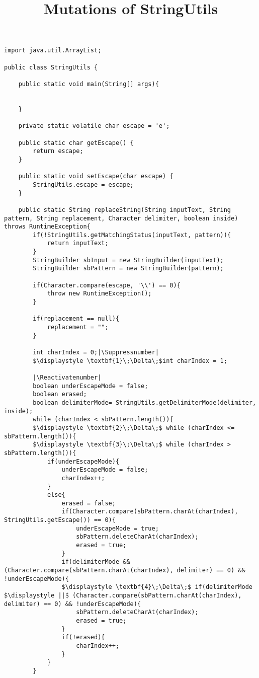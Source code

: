 \documentclass{article}
\makeatletter
\let\origthelstnumber\thelstnumber
\newcommand*\Suppressnumber{%
  \lst@AddToHook{OnNewLine}{%
    \let\thelstnumber\relax%
     \advance\c@lstnumber-\@ne\relax%
    }%
}
\newcommand*\Reactivatenumber{%
  \lst@AddToHook{OnNewLine}{%
   \let\thelstnumber\origthelstnumber%
   \advance\c@lstnumber\@ne\relax}%
}
\makeatother
\begin{document}
\title{Mutations of StringUtils}
\date{}
\maketitle

\begin{lstlisting}
import java.util.ArrayList;

public class StringUtils {

    public static void main(String[] args){
	

    }

    private static volatile char escape = 'e';

    public static char getEscape() {
        return escape;
    }

    public static void setEscape(char escape) {
        StringUtils.escape = escape;
    }

    public static String replaceString(String inputText, String pattern, String replacement, Character delimiter, boolean inside) throws RuntimeException{
        if(!StringUtils.getMatchingStatus(inputText, pattern)){
            return inputText;
        }
        StringBuilder sbInput = new StringBuilder(inputText);
        StringBuilder sbPattern = new StringBuilder(pattern);

        if(Character.compare(escape, '\\') == 0){
            throw new RuntimeException();
        }

        if(replacement == null){
            replacement = "";
        }

        int charIndex = 0;|\Suppressnumber|
        $\displaystyle \textbf{1}\;\Delta\;$int charIndex = 1;
        
        |\Reactivatenumber|
        boolean underEscapeMode = false;
        boolean erased;
        boolean delimiterMode= StringUtils.getDelimiterMode(delimiter, inside);
        while (charIndex < sbPattern.length()){
        $\displaystyle \textbf{2}\;\Delta\;$ while (charIndex <= sbPattern.length()){
        $\displaystyle \textbf{3}\;\Delta\;$ while (charIndex > sbPattern.length()){
            if(underEscapeMode){
                underEscapeMode = false;
                charIndex++;
            }
            else{
                erased = false;
                if(Character.compare(sbPattern.charAt(charIndex), StringUtils.getEscape()) == 0){
                    underEscapeMode = true;
                    sbPattern.deleteCharAt(charIndex);
                    erased = true;
                }
                if(delimiterMode && (Character.compare(sbPattern.charAt(charIndex), delimiter) == 0) && !underEscapeMode){
                $\displaystyle \textbf{4}\;\Delta\;$ if(delimiterMode $\displaystyle ||$ (Character.compare(sbPattern.charAt(charIndex), delimiter) == 0) && !underEscapeMode){
                    sbPattern.deleteCharAt(charIndex);
                    erased = true;
                }
                if(!erased){
                    charIndex++;
                }
            }
        }


\end{lstlisting}
\end{document}
